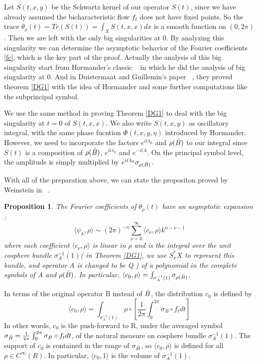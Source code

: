 \documentclass[10pt]{amsart}
\newtheorem{proposition}[theorem]{Proposition}
\newcommand{\1}{\mathbb{1}}
\begin{document}
Let $S(t,x,y)$ be the Schwartz kernel of our operator $S(t)$, since we have already assumed the bicharacteristic flow $f_t$ does not have fixed points. So the trace $\theta_{\rho} (t) = Tr (S(t)) = \int_X S(t,x,x) dx$ is a smooth function on $(0,2\pi)$. Then we are left with the only big singularities at 0. By analyzing this singularity we can determine the asymptotic behavior of the Fourier coefficients \eqref{fc}, which is the key part of the proof. Actually the analysis of this big singularity start from Hormander's classic ~\cite{Hor68} in which he did the analysis of big singularity at 0. And in Duistermaat and Guillemin's paper ~\cite{DuistermaatGuillemin}, they proved theorem \ref{DG1} with the idea of Hormander and some further computations like the subprincipal symbol.  

We use the same method in proving Theorem \ref{DG1} to deal with the big singularity at $t=0$ of $S(t,x,x)$. We also write $S(t,x,y)$ as oscillatory integral, with the same phase fucntion $\Phi(t,x,y,\eta)$ introduced by Hormander. However, we need to incorporate the factors $e^{it\lambda_0}$ and $\rho(\Bar{B})$ to our integral since $S(t)$ is a composition of $\rho(\Bar{B})$, $e^{it\lambda_0}$ and $e^{-itA}$. On the principal symbol level, the amplitude is simply multiplied by $e^{it\lambda_0}\sigma_{\rho(\Bar{B})}$. 

With all of the preparation above, we can state the propositon proved by Weinstein in ~\cite{Wein77}.

\begin{proposition} \label{we77}
    The Fourier coefficients of $\theta_{\rho}(t)$ have an asymptotic expansion :
    \begin{equation}
        \langle \psi_k, \rho \rangle \sim (2\pi)^{-n} \sum_{\nu = 0}^{\infty} \langle c_{\nu}, \rho \rangle k^{n-\nu -1}
    \end{equation}
    where each coefficient $\langle c_{\nu}, \rho \rangle$ is linear in $\rho$ and is the integral over the unit cosphere bundle $\sigma_A^{-1}(1)$( in Theorem \ref{DG1}, we use $S^*_x X$ to represent this bundle, and operator A is changed to be Q ) of a polynomial in the complete symbols of A and $\rho(\Bar{B})$. In particular, $\langle c_0, \rho \rangle = \int_{\sigma_A^{-1}(1)} \sigma_{\rho(\Bar{B})}$.
\end{proposition}

In terms of the original operator B instead of $\Bar{B}$, the distribution $c_0$ is defined by 
\[
\langle c_0,\rho \rangle = \int_{\sigma_A^{-1}(1)} \rho \circ [\frac{1}{2\pi}\int_0^{2\pi}\sigma_B \circ f_t dt]
\]
In other words, $c_0$ is the push-forward to R, under the averaged symbol $\sigma_{\Bar{B}} = \frac{1}{2\pi}\int_0^{2\pi}\sigma_B \circ f_t dt$, of the natural measure on cosphere bundle $\sigma_A^{-1}(1)$. The support of $c_0$ is contained in the range of $\sigma_{\Bar{B}}$, so $\langle c_0,\rho \rangle $ is defined for all $\rho \in C^{\infty}(R)$. In particular, $\langle c_0,1 \rangle $ is the volume of $\sigma_A^{-1}(1)$.
\end{document}
